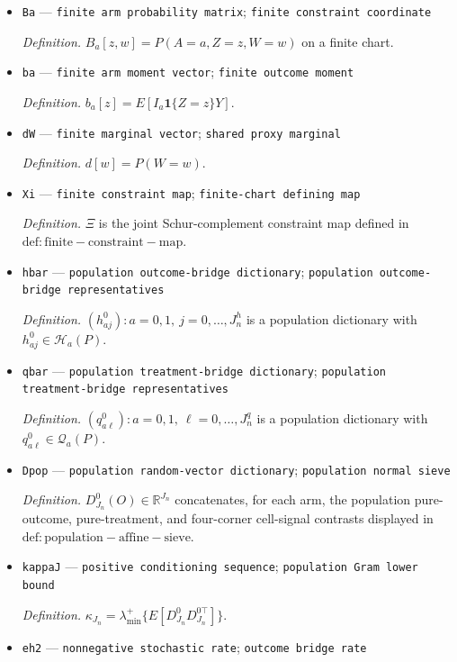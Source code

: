 \documentclass{article}
\begin{document}
\begin{itemize}
  \item \texttt{Ba} --- \texttt{finite arm probability matrix}; \texttt{finite constraint coordinate}
  \par\smallskip\noindent\emph{Definition.} \(B_a[z,w]=P(A=a,Z=z,W=w)\) on a finite chart.
  \item \texttt{ba} --- \texttt{finite arm moment vector}; \texttt{finite outcome moment}
  \par\smallskip\noindent\emph{Definition.} \(b_a[z]=E[I_a\mathbf 1\{Z=z\}Y]\).
  \item \texttt{dW} --- \texttt{finite marginal vector}; \texttt{shared proxy marginal}
  \par\smallskip\noindent\emph{Definition.} \(d[w]=P(W=w)\).
  \item \texttt{Xi} --- \texttt{finite constraint map}; \texttt{finite-\allowbreak{}chart defining map}
  \par\smallskip\noindent\emph{Definition.} \(\Xi\) is the joint Schur-complement constraint map defined in \(\mathrm{def:finite-constraint-map}\).
  \item \texttt{hbar} --- \texttt{population outcome-\allowbreak{}bridge dictionary}; \texttt{population outcome-\allowbreak{}bridge representatives}
  \par\smallskip\noindent\emph{Definition.} \((h^0_{aj}):a=0,1,\ j=0,\ldots,J_n^h\) is a population dictionary with \(h^0_{aj}\in\mathcal H_a(P)\).
  \item \texttt{qbar} --- \texttt{population treatment-\allowbreak{}bridge dictionary}; \texttt{population treatment-\allowbreak{}bridge representatives}
  \par\smallskip\noindent\emph{Definition.} \((q^0_{a\ell}):a=0,1,\ \ell=0,\ldots,J_n^q\) is a population dictionary with \(q^0_{a\ell}\in\mathcal Q_a(P)\).
  \item \texttt{Dpop} --- \texttt{population random-\allowbreak{}vector dictionary}; \texttt{population normal sieve}
  \par\smallskip\noindent\emph{Definition.} \(D^0_{J_n}(O)\in\mathbb R^{J_n}\) concatenates, for each arm, the population pure-outcome, pure-treatment, and four-corner cell-signal contrasts displayed in \(\mathrm{def:population-affine-sieve}\).
  \item \texttt{kappaJ} --- \texttt{positive conditioning sequence}; \texttt{population Gram lower bound}
  \par\smallskip\noindent\emph{Definition.} \(\kappa_{J_n}=\lambda_{\min}^{+}\{E[D^0_{J_n}D^{0\top}_{J_n}]\}\).
  \item \texttt{eh2} --- \texttt{nonnegative stochastic rate}; \texttt{outcome bridge rate}

\end{itemize}
\end{document}
